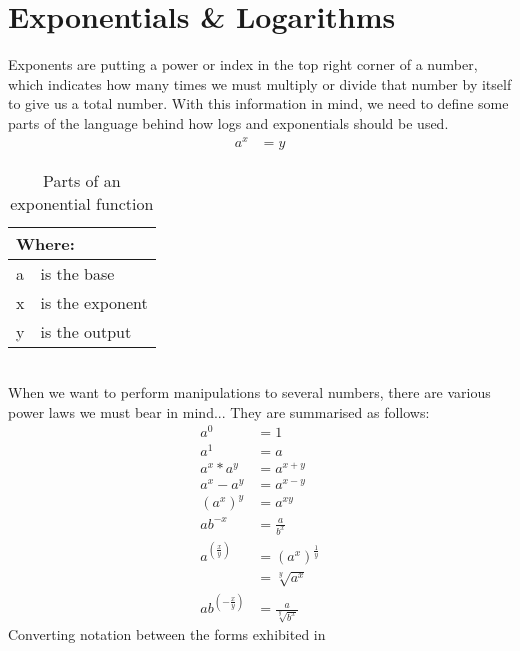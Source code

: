 \section{Exponentials \& Logarithms}
\label{sec:ExponentialsAndLogarithms}
Exponents are putting a power or index in the top right corner of a number,
which indicates how many times we must multiply or divide that number by
itself to give us a total number. With this information in mind, we need to
define some parts of the language  behind how logs and exponentials should be
used.
\begin{align}
  {a}^{x} & = y
  \label{eq:ExponentialForm}
\end{align}
\begin{table}[!hbt]
\label{tab:PartsOfAnExponential}
\begin{tabularx}{\linewidth}{| l X |}
\hline
\multicolumn{2}{|l|}{Where:} \\
\hline \hline
a & is the base\\
x & is the exponent\\
y & is the output\\
\hline
\end{tabularx}
\caption{Parts of an exponential function}
\end{table}
\\
When we want to perform manipulations to several numbers, there are various
power laws we must bear in mind... They are summarised as follows:
\begin{align}
  {a}^{0}               & = 1 \label{eq:ExponentLaw_Power0} \\
  {a}^{1}               & = a \label{eq:ExponentLaw_Power1} \\
  {a}^{x} * {a}^{y}     & = {a}^{x+y} \label{eq:ExponentLaw_AddExps} \\
  {a}^{x} - {a}^{y}     & = {a}^{x-y} \label{eq:ExponentLaw_SubExps} \\
  {({a}^{x})}^{y}       & = {a}^{xy} \label{eq:ExponentLaw_MultExps} \\
  a{b}^{-x}             & = \frac{a}{{b}^{x}} \label{eq:ExponentLaw_NegExp} \\
  {a}^{(\frac{x}{y})}   & = {({a}^{x})}^{\frac{1}{y}}
                            \label{eq:ExponentLaw_FracExp0} \\
                        & = \sqrt[y]{{a}^{x}} \label{eq:ExponentLaw_FracExp1}\\
  a{b}^{(-\frac{x}{y})} & = \frac{a}{\sqrt[y]{{b}^{x}}}
\end{align}
Converting notation between the forms exhibited in
